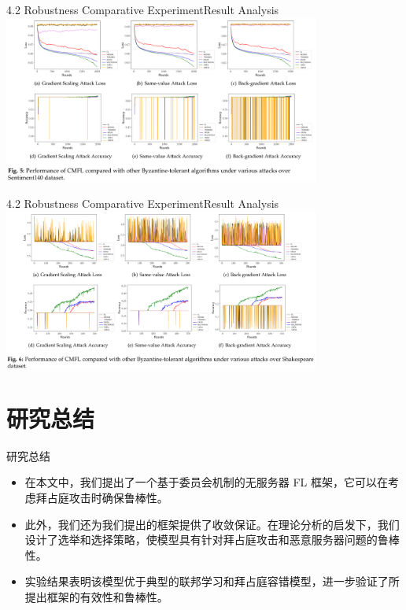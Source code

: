 \documentclass{sintefbeamer}
\theoremstyle{definition}
\begin{document}
\begin{frame}{4.2 Robustness Comparative Experiment}{Result Analysis}
	\includegraphics[width=0.78\textwidth]{images/exp_fig5}
\end{frame}

\begin{frame}{4.2 Robustness Comparative Experiment}{Result Analysis}
	\includegraphics[width=0.78\textwidth]{images/exp_fig6}
\end{frame}

\section{研究总结}

\begin{frame}{研究总结}


\begin{itemize}
    \item 在本文中，我们提出了一个基于委员会机制的无服务器 FL 框架，它可以在考虑拜占庭攻击时确保鲁棒性。
    \item 此外，我们还为我们提出的框架提供了收敛保证。在理论分析的启发下，我们设计了选举和选择策略，使模型具有针对拜占庭攻击和恶意服务器问题的鲁棒性。
    \item 实验结果表明该模型优于典型的联邦学习和拜占庭容错模型，进一步验证了所提出框架的有效性和鲁棒性。
  \end{itemize}
\end{frame}



\backmatter
\end{document}
